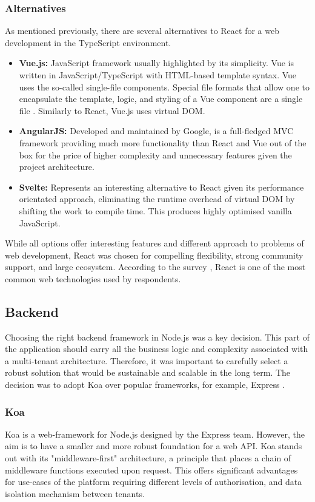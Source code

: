 \subsubsection{Alternatives}
As mentioned previously, there are several alternatives to React for a web development in the TypeScript environment.
\begin{itemize}
    \item \textbf{Vue.js:} JavaScript framework usually highlighted by its simplicity. Vue is written in JavaScript/TypeScript with HTML-based template syntax. Vue uses the so-called single-file components. Special file formats that allow one to encapsulate the template, logic, and styling of a Vue component are a single file \cite{vue-docs}. Similarly to React, Vue.js uses virtual \ac{DOM}.
    \item \textbf{AngularJS:} Developed and maintained by Google, is a full-fledged \ac{MVC} framework providing much more functionality than React and Vue out of the box for the price of higher complexity and unnecessary features given the project architecture.
    \item \textbf{Svelte:} Represents an interesting alternative to React given its performance orientated approach, eliminating the runtime overhead of virtual \ac{DOM} by shifting the work to compile time. This produces highly optimised vanilla JavaScript. 
\end{itemize}

While all options offer interesting features and different approach to problems of web development, React was chosen for compelling flexibility, strong community support, and large ecosystem.
According to the survey \cite{StackOverflow2023}, React is one of the most common web technologies used by respondents.

\subsection{Backend}
\label{subsec:backend}
Choosing the right backend framework in Node.js was a key decision.
This part of the application should carry all the business logic and complexity associated with a multi-tenant architecture.
Therefore, it was important to carefully select a robust solution that would be sustainable and scalable in the long term.
The decision was to adopt Koa over popular frameworks, for example, Express \cite{express-docs}.

\subsubsection{Koa}
Koa \cite{koajs-docs} is a web-framework for Node.js designed by the Express team.
However, the aim is to have a smaller and more robust foundation for a web API.
Koa stands out with its "middleware-first" architecture, a principle that places a chain of middleware functions executed upon request.
This offers significant advantages for use-cases of the platform requiring different levels of authorisation, and data isolation mechanism between tenants.

